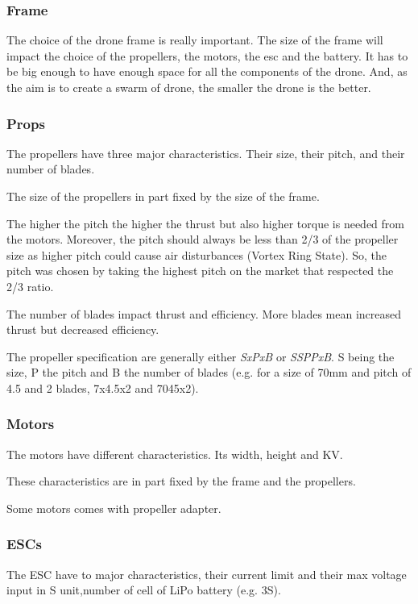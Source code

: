 \subsubsection{Frame}
The choice of the drone frame is really important.
The size of the frame will impact the choice of the propellers, the motors, the \acrshort{esc} and the battery.
It has to be big enough to have enough space for all the components of the drone.
And, as the aim is to create a swarm of drone, the smaller the drone is the better.

\subsubsection{Props}
The propellers have three major characteristics. Their size, their pitch, and their number of blades.

The size of the propellers in part fixed by the size of the frame.

The higher the pitch the higher the thrust but also higher torque is needed from the motors.
Moreover, the pitch should always be less than 2/3 of the propeller size as higher pitch could cause air disturbances (Vortex Ring State).
So, the pitch was chosen by taking the highest pitch on the market that respected the 2/3 ratio.

The number of blades impact thrust and efficiency. More blades mean increased thrust but decreased efficiency.

The propeller specification are generally either \emph{SxPxB} or \emph{SSPPxB}.
S being the size, P the pitch and B the number of blades
(e.g. for a size of 70mm and pitch of 4.5 and 2 blades, 7x4.5x2 and 7045x2).

\subsubsection{Motors}
The motors have different characteristics. Its width, height and KV.

These characteristics are in part fixed by the frame and the propellers.

Some motors comes with propeller adapter.

\subsubsection{ESCs}
The ESC have to major characteristics, their current limit and their max voltage input in S unit,number of cell of LiPo battery (e.g. 3S).

